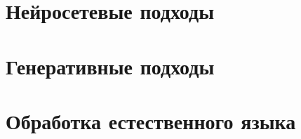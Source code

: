 
\section{Нейросетевые подходы}



\section{Генеративные подходы}



\section{Обработка естественного языка}



